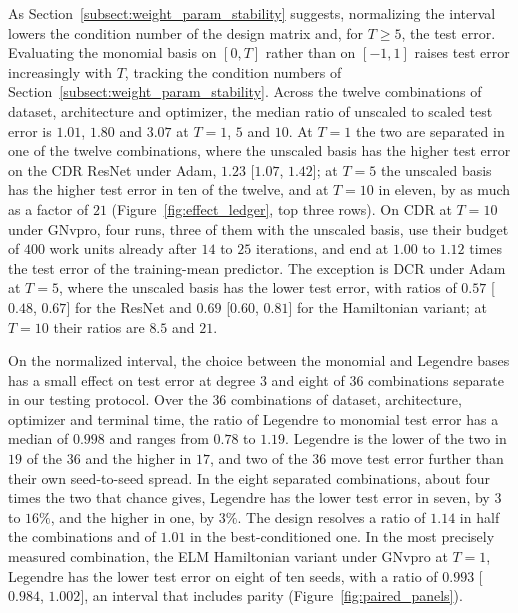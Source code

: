 \documentclass[pdflatex,sn-mathphys-num]{sn-jnl}%
\theoremstyle{thmstyleone}%
\theoremstyle{thmstyletwo}%
\theoremstyle{thmstylethree}%
\begin{document}
As Section~\ref{subsect:weight_param_stability} suggests, normalizing the interval lowers the condition number of the design matrix and, for $T\ge5$, the test error.
%
Evaluating the monomial basis on $[0,T]$ rather than on $[-1,1]$ raises test error increasingly with $T$, tracking the condition numbers of Section~\ref{subsect:weight_param_stability}. Across the twelve combinations of dataset, architecture and optimizer, the median ratio of unscaled to scaled test error is $1.01$, $1.80$ and $3.07$ at $T=1$, $5$ and $10$.
%
At $T=1$ the two are separated in one of the twelve combinations, where the unscaled basis has the higher test error on the CDR ResNet under Adam, $1.23$ [$1.07$, $1.42$]; at $T=5$ the unscaled basis has the higher test error in ten of the twelve, and at $T=10$ in eleven, by as much as a factor of $21$ (Figure~\ref{fig:effect_ledger}, top three rows). On CDR at $T=10$ under GNvpro, four runs, three of them with the unscaled basis, use their budget of $400$ work units already after $14$ to $25$ iterations, and end at $1.00$ to $1.12$ times the test error of the training-mean predictor.
%
The exception is DCR under Adam at $T=5$, where the unscaled basis has the lower test error, with ratios of $0.57$ [$0.48$, $0.67$] for the ResNet and $0.69$ [$0.60$, $0.81$] for the Hamiltonian variant; at $T=10$ their ratios are $8.5$ and $21$.
%

On the normalized interval, the choice between the monomial and Legendre bases has a small effect on test error at degree $3$ and eight of $36$ combinations separate in our testing protocol.
Over the $36$ combinations of dataset, architecture, optimizer and terminal time, the ratio of Legendre to monomial test error has a median of $0.998$ and ranges from $0.78$ to $1.19$. Legendre is the lower of the two in $19$ of the $36$ and the higher in $17$, and two of the $36$ move test error further than their own seed-to-seed spread. In the eight separated combinations, about four times the two that chance gives, Legendre has the lower test error in seven, by $3$ to $16\%$, and the higher in one, by $3\%$. The design resolves a ratio of $1.14$ in half the combinations and of $1.01$ in the best-conditioned one.
%
In the most precisely measured combination, the ELM Hamiltonian variant under GNvpro at $T=1$, Legendre has the lower test error on eight of ten seeds, with a ratio of $0.993$ [$0.984$, $1.002$], an interval that includes parity (Figure~\ref{fig:paired_panels}).
%
\end{document}
